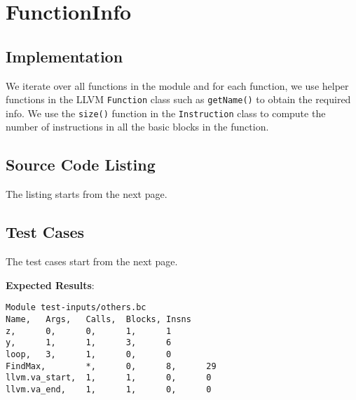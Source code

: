\section{FunctionInfo}

\subsection{Implementation}

We iterate over all functions in the module and for each function, we use helper functions in the
LLVM \texttt{Function} class such as \texttt{getName()} to obtain the required info.
We use the \texttt{size()} function in the \texttt{Instruction} class to compute the number of
instructions in all the basic blocks in the function.

\subsection{Source Code Listing}

The listing starts from the next page.



\subsection{Test Cases}

The test cases start from the next page.



\textbf{Expected Results}:\\

\begin{verbatim}
Module test-inputs/others.bc
Name,   Args,   Calls,  Blocks, Insns
z,      0,      0,      1,      1
y,      1,      1,      3,      6
loop,   3,      1,      0,      0
FindMax,        *,      0,      8,      29
llvm.va_start,  1,      1,      0,      0
llvm.va_end,    1,      1,      0,      0
\end{verbatim}

